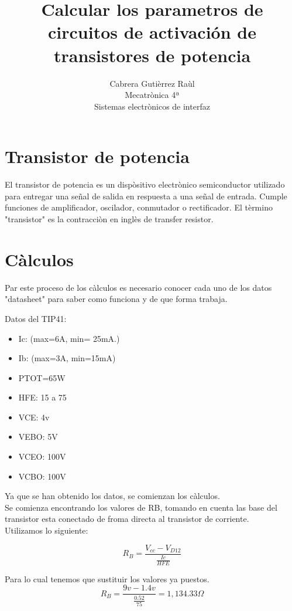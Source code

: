 \documentclass[11pt]{article}
\title{\textbf{Calcular los parametros de circuitos de activación de transistores de potencia}}
\author{Cabrera Gutièrrez Raùl
\\ Mecatrònica 4ª
\\
Sistemas electrònicos de interfaz}
\date{}
\begin{document}
\maketitle

\section{Transistor de potencia}

 El transistor de potencia es un dispòsitivo electrònico semiconductor utilizado para entregar una señal de salida en respuesta a una señal de entrada. Cumple funciones de amplificador, oscilador, conmutador o rectificador.
 El tèrmino "transistor" es la contracciòn en inglès de transfer resistor.
\section{Càlculos}
Par este proceso de los càlculos es necesario conocer cada uno de los datos "datasheet" para saber como funciona y de que forma trabaja.

Datos del TIP41:\\
\begin{itemize}
\item Ic: (max=6A, min= 25mA.)
\item Ib: (max=3A, min=15mA)
\item PTOT=65W\\
\item HFE: 15 a 75\\
\item VCE: 4v\\
\item VEBO: 5V\\
\item VCEO: 100V\\
\item VCBO: 100V\\
\end{itemize}


Ya que se han obtenido los datos, se comienzan los càlculos.
\\
Se comienza encontrando los valores de RB, tomando en cuenta las base del transistor  esta conectado de froma directa al transistor de corriente.
\\
Utilizamos lo siguiente:

$$ R_{B}=\frac{V_{cc}-V_{D12}}{ \frac{Ic}{HFE} } $$

Para lo cual tenemos que sustituir los valores ya puestos.
\\
$$ R_{B}=\frac{9v-1.4v}{ \frac{0.52}{75}}= 1,134.33\Omega $$
\\
\end{document}
